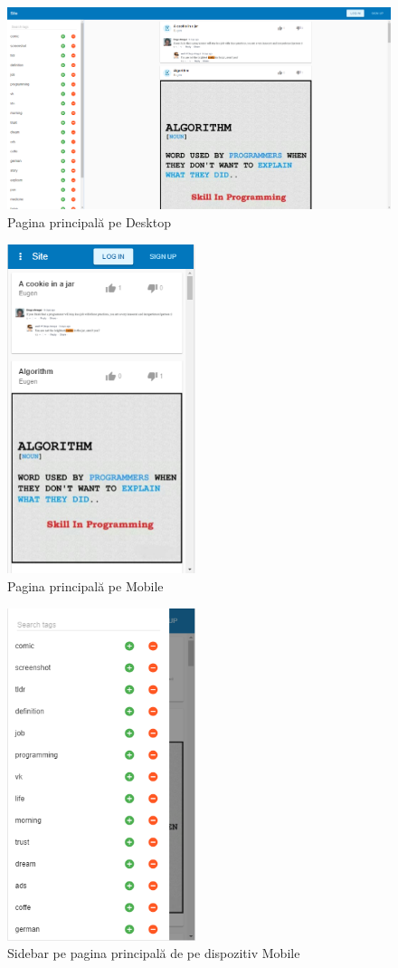 \begin{figure}[ht]
	\centering
	\includegraphics[width=16cm]{home}
	\caption{Pagina principală pe Desktop}
\end{figure}

\begin{figure}[ht]
	\centering
	\includegraphics[width=5.5cm]{homeMobile}
	\caption{Pagina principală pe Mobile}
\end{figure}

\begin{figure}[ht]
	\centering
	\includegraphics[width=5.5cm]{homeMobileSidebar}
	\caption{Sidebar pe pagina principală de pe dispozitiv Mobile}
\end{figure}

